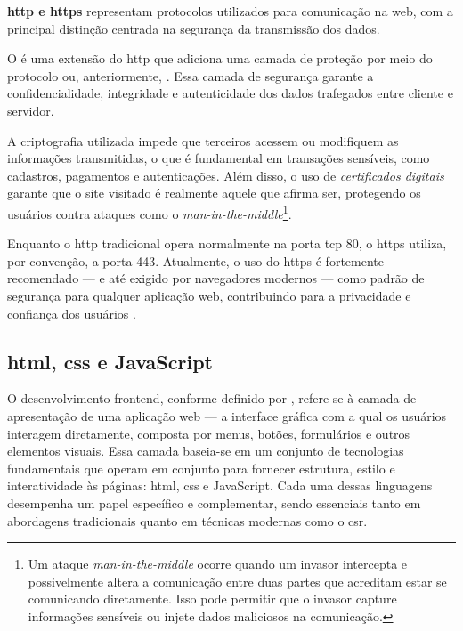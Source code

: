 \textbf{\acrshort{http} e \acrshort{https}} representam protocolos utilizados para comunicação na web, com a principal distinção centrada na segurança da transmissão dos dados.

O \textbf{} é uma extensão do \acrshort{http} que adiciona uma camada de proteção por meio do protocolo  ou, anteriormente, . Essa camada de segurança garante a confidencialidade, integridade e autenticidade dos dados trafegados entre cliente e servidor. 

A criptografia utilizada impede que terceiros acessem ou modifiquem as informações transmitidas, o que é fundamental em transações sensíveis, como cadastros, pagamentos e autenticações. Além disso, o uso de \textit{certificados digitais} garante que o site visitado é realmente aquele que afirma ser, protegendo os usuários contra ataques como o \textit{man-in-the-middle}\footnote{Um ataque \textit{man-in-the-middle} ocorre quando um invasor intercepta e possivelmente altera a comunicação entre duas partes que acreditam estar se comunicando diretamente. Isso pode permitir que o invasor capture informações sensíveis ou injete dados maliciosos na comunicação.\cite{wikipedia_man_in_the_middle}}.

Enquanto o \acrshort{http} tradicional opera normalmente na porta \acrshort{tcp} 80, o \acrshort{https} utiliza, por convenção, a porta 443. Atualmente, o uso do \acrshort{https} é fortemente recomendado — e até exigido por navegadores modernos — como padrão de segurança para qualquer aplicação web, contribuindo para a privacidade e confiança dos usuários \cite{wikipedia_http}.

\subsection{\acrshort{html}, \acrshort{css} e JavaScript}
\label{subsec:html-css-js}


O desenvolvimento frontend, conforme definido por , refere-se à camada de apresentação de uma aplicação web — a interface gráfica com a qual os usuários interagem diretamente, composta por menus, botões, formulários e outros elementos visuais. Essa camada baseia-se em um conjunto de tecnologias fundamentais que operam em conjunto para fornecer estrutura, estilo e interatividade às páginas: \acrshort{html}, \acrshort{css} e JavaScript. Cada uma dessas linguagens desempenha um papel específico e complementar, sendo essenciais tanto em abordagens tradicionais quanto em técnicas modernas como o \acrshort{csr}.


